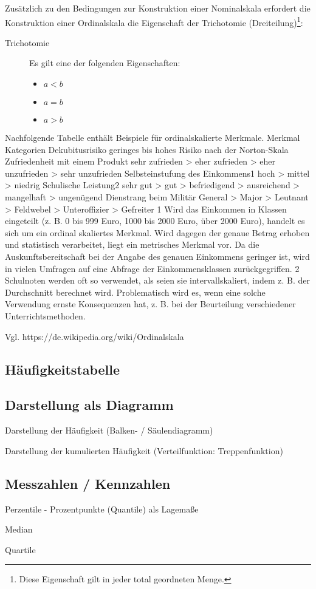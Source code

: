 Zusätzlich zu den Bedingungen zur Konstruktion einer Nominalskala erfordert die Konstruktion einer Ordinalskala die Eigenschaft der Trichotomie (Dreiteilung)\footnote{Diese Eigenschaft gilt in jeder total geordneten Menge.}:
\begin{description}
	\item[Trichotomie] Es gilt eine der folgenden Eigenschaften:
		\begin{itemize}
		  \item $a < b$
		  \item $a = b$
		  \item $a > b$ 
		\end{itemize} 
\end{description}




\todo[Einbauen]
Nachfolgende Tabelle enthält Beispiele für ordinalskalierte Merkmale.
Merkmal	Kategorien
Dekubitusrisiko	geringes bis hohes Risiko nach der Norton-Skala
Zufriedenheit mit einem Produkt	sehr zufrieden > eher zufrieden > eher unzufrieden > sehr unzufrieden
Selbsteinstufung des Einkommens1	hoch > mittel > niedrig
Schulische Leistung2	sehr gut > gut > befriedigend > ausreichend > mangelhaft > ungenügend
Dienstrang beim Militär	General > Major > Leutnant > Feldwebel > Unteroffizier > Gefreiter
1 Wird das Einkommen in Klassen eingeteilt (z. B. 0 bis 999 Euro, 1000 bis 2000 Euro, über 2000 Euro), handelt es sich um ein ordinal skaliertes Merkmal. Wird dagegen der genaue Betrag erhoben und statistisch verarbeitet, liegt ein metrisches Merkmal vor. Da die Auskunftsbereitschaft bei der Angabe des genauen Einkommens geringer ist, wird in vielen Umfragen auf eine Abfrage der Einkommensklassen zurückgegriffen.
2 Schulnoten werden oft so verwendet, als seien sie intervallskaliert, indem z. B. der Durchschnitt berechnet wird. Problematisch wird es, wenn eine solche Verwendung ernste Konsequenzen hat, z. B. bei der Beurteilung verschiedener Unterrichtsmethoden.



Vgl. https://de.wikipedia.org/wiki/Ordinalskala 	


\subsection{Häufigkeitstabelle}

\subsection{Darstellung als Diagramm}
Darstellung der Häufigkeit (Balken- / Säulendiagramm)

Darstellung der kumulierten Häufigkeit (Verteilfunktion: Treppenfunktion)

\subsection{Messzahlen / Kennzahlen}

Perzentile - Prozentpunkte (Quantile) als Lagemaße

Median
 
Quartile